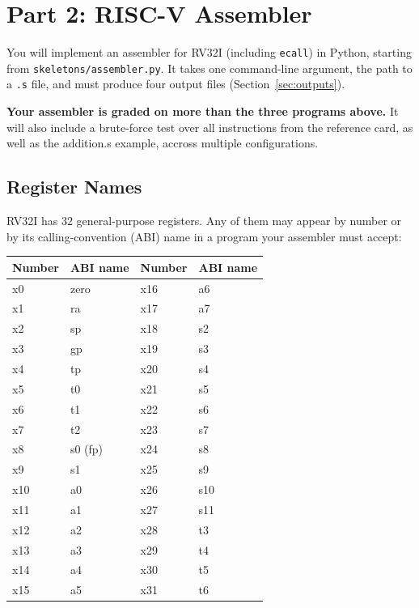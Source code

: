 \documentclass[11pt]{article}
\begin{document}
\newpage

\section{Part 2: RISC-V Assembler}
\label{sec:assembler-reqs}

You will implement an assembler for RV32I (including \texttt{ecall}) in
Python, starting from \texttt{skeletons/\allowbreak assembler.py}. It takes one
command-line argument, the path to a \texttt{.s} file, and must produce
four output files (Section~\ref{sec:outputs}).

\begin{important}
\textbf{Your assembler is graded on more than the three programs above.}
It will also include a brute-force test over all instructions from the reference card, as well as the addition.s example, accross multiple configurations.
\end{important}

\subsection{Register Names}
\label{sec:regnames}
RV32I has 32 general-purpose registers. Any of them may appear by number
or by its calling-convention (ABI) name in a program your assembler must
accept:

\begin{center}
\begin{tabular}{@{}llll@{}}
\toprule
\textbf{Number} & \textbf{ABI name} & \textbf{Number} & \textbf{ABI name} \\
\midrule
x0  & zero        & x16 & a6 \\
x1  & ra          & x17 & a7 \\
x2  & sp          & x18 & s2 \\
x3  & gp          & x19 & s3 \\
x4  & tp          & x20 & s4 \\
x5  & t0          & x21 & s5 \\
x6  & t1          & x22 & s6 \\
x7  & t2          & x23 & s7 \\
x8  & s0 (fp)     & x24 & s8 \\
x9  & s1          & x25 & s9 \\
x10 & a0          & x26 & s10 \\
x11 & a1          & x27 & s11 \\
x12 & a2          & x28 & t3 \\
x13 & a3          & x29 & t4 \\
x14 & a4          & x30 & t5 \\
x15 & a5          & x31 & t6 \\
\bottomrule
\end{tabular}
\label{tab:regnames}
\end{center}
\end{document}
